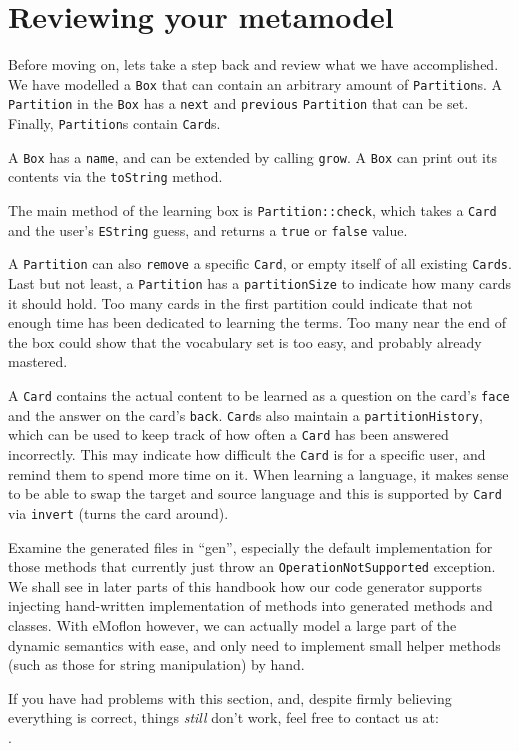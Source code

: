 \newpage 
\genHeader
\section{Reviewing your metamodel}
\hypertarget{static review}{}

Before moving on, lets take a step back and review what we have accomplished. We have modelled a \texttt{Box} that can contain an arbitrary amount of
\texttt{Partition}s. A \texttt{Partition} in the \texttt{Box} has a \texttt{next} and \texttt{previous} \texttt{Partition} that can be set. Finally,
\texttt{Partition}s contain \texttt{Card}s.

A \texttt{Box} has a \texttt{name}, and can be extended by calling \texttt{grow}. A \texttt{Box} can print out its contents via the \texttt{toString} method.

The main method of the learning box is \texttt{Partition::check}, which takes a \texttt{Card} and the user's \texttt{EString} guess, and returns a \texttt{true}
or \texttt{false} value.

A \texttt{Partition} can also \texttt{remove} a specific \texttt{Card}, or empty itself of all  existing \texttt{Cards}. Last but not least, a
\texttt{Partition} has a \texttt{partitionSize} to indicate how many cards it should hold. Too many cards in the first partition could indicate that not
enough time has been dedicated to learning the terms. Too many near the end of the box could show that the vocabulary set is too easy, and probably
already mastered.

A \texttt{Card} contains the actual content to be learned as a question on the card's \texttt{face} and the answer on the card's \texttt{back}. \texttt{Card}s
also maintain a \texttt{partition\-History}, which can be used to keep track of how often a \texttt{Card} has been answered incorrectly.
This may indicate how difficult the \texttt{Card} is for a specific user, and remind them to spend more time on it. When learning a language, it makes
sense to be able to swap the target and source language and this is supported by \texttt{Card} via \texttt{invert} (turns the card around).

Examine the generated files in ``gen'', especially the default implementation for those methods that currently just throw an \texttt{OperationNotSupported}
exception. We shall see in later parts of this handbook how our code generator supports injecting hand-written implementation of methods into generated methods
and classes. With eMoflon however, we can actually model a large part of the dynamic semantics with ease, and only need to implement small helper methods (such
as those for string manipulation) by hand.

If you have had problems with this section, and, despite firmly believing everything is correct, things \emph{still} don't work, feel free to contact us at:\\ 
\eMoflonContact.

